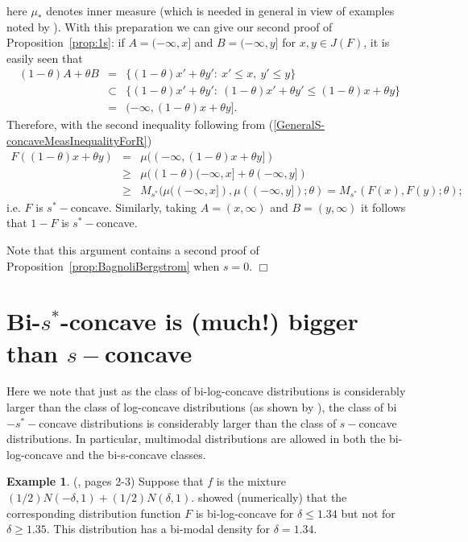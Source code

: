 \documentclass[11pt]{amsart}
\numberwithin{equation}{section}
\theoremstyle{definition}\newtheorem{definition}{Definition}
\theoremstyle{remark}\newtheorem{assumption}{Assumption}
\theoremstyle{remark}\newtheorem{remark}{Remark}
\theoremstyle{definition}\newtheorem{example}{Example}
\theoremstyle{plain}\newtheorem{question}{Question}
\theoremstyle{plain}\newtheorem{theorem}{Theorem}
\theoremstyle{plain}\newtheorem{lemma}{Lemma}
\theoremstyle{plain}\newtheorem{proposition}{Proposition}
\theoremstyle{plain}\newtheorem{corollary}{Corollary}
\theoremstyle{plain}\newtheorem{conjecture}{Conjecture}
\begin{document}
here $\mu_{*}$ denotes inner measure 
(which is needed in general in view of examples noted by \cite{MR0260958}).
With this preparation we can give our second proof of Proposition~\ref{prop:1s}:     
if $A = (-\infty, x]$ and $B = (-\infty, y]$ for $x,y \in J(F)$,
it is easily seen that 
\begin{eqnarray*} 
(1-\theta) A + \theta B 
& = & \{ (1-\theta ) x' + \theta y' : \ x' \le x , \ y' \le y \}\\
& \subset & \{ (1-\theta ) x' + \theta y' : \ (1-\theta )x' + \theta y'  \le (1-\theta) x + \theta y \} \\
& = & (-\infty, (1-\theta)x + \theta y ].
\end{eqnarray*}
Therefore, with the second inequality following from (\ref{GeneralS-concaveMeasInequalityForR})
\begin{eqnarray*}
F((1-\theta) x + \theta y) 
& = & \mu ((-\infty, (1-\theta)x + \theta y])\\
& \ge & \mu ( (1-\theta ) (-\infty,x] + \theta (-\infty, y]) \\
& \ge & M_{s^*} ( \mu ((-\infty,x]) , \mu ((-\infty, y]); \theta ) = M_{s^*} (F(x), F(y); \theta ) ;
\end{eqnarray*}
i.e. $F$ is $s^*-$concave.  Similarly, taking $A = (x,\infty)$ and $B = (y,\infty) $ it follows that
$1-F$ is $s^*-$concave.  

Note that this argument contains a second proof of Proposition~\ref{prop:BagnoliBergstrom} when $s=0$.  
\hfill $\Box$

\section{Bi-$s^*$-concave is (much!) bigger than $s-$concave}
\label{sec:BiIsBigger}

Here we note that just as the class of bi-log-concave distributions is considerably larger 
than the class of log-concave distributions (as shown by \cite{DuembgenKW:2017}), the class of bi$-s^*-$concave distributions is 
considerably larger than the class of $s-$concave distributions.  In particular, multimodal distributions
are allowed in both the bi-log-concave and the bi-s-concave classes. 
 
\begin{example}
\label{exmpl:ex5} 
(\cite{DuembgenKW:2017}, pages 2-3) Suppose that $f$ is  the mixture  $(1/2)N(-\delta,1) +(1/2) N(\delta,1)$.  
\cite{DuembgenKW:2017} showed (numerically) that the corresponding distribution function $F$ is bi-log-concave for $\delta \le 1.34$
but not for $\delta \ge 1.35$.  This distribution has a bi-modal density for $\delta = 1.34$.  
\end{example}  
 
\end{document}
